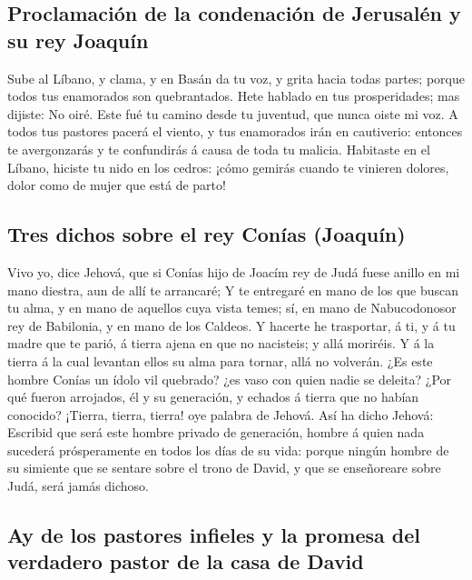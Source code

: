 \hypertarget{proclamaciuxf3n-de-la-condenaciuxf3n-de-jerusaluxe9n-y-su-rey-joaquuxedn}{%
\subsection{Proclamación de la condenación de Jerusalén y su rey
Joaquín}\label{proclamaciuxf3n-de-la-condenaciuxf3n-de-jerusaluxe9n-y-su-rey-joaquuxedn}}

 Sube al Líbano, y clama, y en Basán da tu voz, y grita
hacia todas partes; porque todos tus enamorados son quebrantados.
 Hete hablado en tus prosperidades; mas dijiste: No oiré.
Este fué tu camino desde tu juventud, que nunca oiste mi voz.
 A todos tus pastores pacerá el viento, y tus enamorados
irán en cautiverio: entonces te avergonzarás y te confundirás á causa de
toda tu malicia.  Habitaste en el Líbano, hiciste tu nido
en los cedros: ¡cómo gemirás cuando te vinieren dolores, dolor como de
mujer que está de parto!

\hypertarget{tres-dichos-sobre-el-rey-conuxedas-joaquuxedn}{%
\subsection{Tres dichos sobre el rey Conías
(Joaquín)}\label{tres-dichos-sobre-el-rey-conuxedas-joaquuxedn}}

 Vivo yo, dice Jehová, que si Conías hijo de Joacím rey de
Judá fuese anillo en mi mano diestra, aun de allí te arrancaré;
 Y te entregaré en mano de los que buscan tu alma, y en
mano de aquellos cuya vista temes; sí, en mano de Nabucodonosor rey de
Babilonia, y en mano de los Caldeos.  Y hacerte he
trasportar, á ti, y á tu madre que te parió, á tierra ajena en que no
nacisteis; y allá moriréis.  Y á la tierra á la cual
levantan ellos su alma para tornar, allá no volverán.  ¿Es
este hombre Conías un ídolo vil quebrado? ¿es vaso con quien nadie se
deleita? ¿Por qué fueron arrojados, él y su generación, y echados á
tierra que no habían conocido?  ¡Tierra, tierra, tierra!
oye palabra de Jehová.  Así ha dicho Jehová: Escribid que
será este hombre privado de generación, hombre á quien nada sucederá
prósperamente en todos los días de su vida: porque ningún hombre de su
simiente que se sentare sobre el trono de David, y que se enseñoreare
sobre Judá, será jamás dichoso.

\hypertarget{ay-de-los-pastores-infieles-y-la-promesa-del-verdadero-pastor-de-la-casa-de-david}{%
\subsection{Ay de los pastores infieles y la promesa del verdadero
pastor de la casa de
David}\label{ay-de-los-pastores-infieles-y-la-promesa-del-verdadero-pastor-de-la-casa-de-david}}

